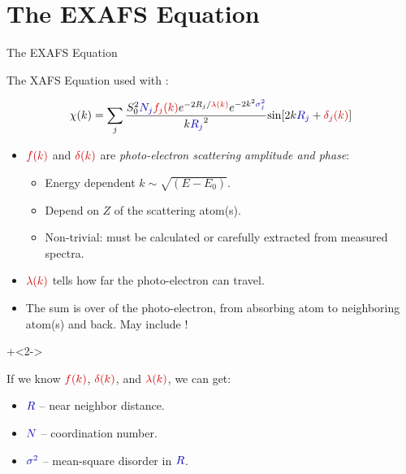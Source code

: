 \section{The EXAFS Equation}

\begin{slide}{The EXAFS Equation}  %

  \begin{cenpage}{135mm}

  The XAFS Equation used with {\feff}:

  \[
  \chi(k) = \sum_j {{ S_0^2 {\Blue{N_j}} {\Red{f_j(k)}}  e^{-2R_j/{\Red{\lambda(k)}}}
      e^{-2k^2{\Blue{\sigma_j^2}}}}\over{k{\Blue{R_j}}^2}}
  {\sin[{2k{\Blue{R_j}} + {\Red{\delta_j(k)}}} ]}
   \]

   \begin{itemize}
  \item $\Red{f(k)}$ and $\Red{\delta(k)}$ are  {\emph{photo-electron scattering
        amplitude and phase}}:
    \begin{itemize}
    \item Energy dependent    \hspace{3mm}  $k \sim \sqrt{(E-E_0)} $.
    \item Depend on $Z$ of the scattering atom(s).
    \item Non-trivial: must be calculated or carefully extracted from  measured spectra.
    \end{itemize}

\item $\Red{\lambda(k)}$ tells how far the photo-electron can travel.

\item The sum is over {} of the photo-electron,
  from absorbing atom to neighboring atom(s) and back.  May include
  {}!

\end{itemize}

   \onslide+<2->

   \begin{postitbox}{64mm}
     If we know $\Red{f(k)}$,  $\Red{\delta(k)}$, and $\Red{\lambda(k)}$, we can get:
     \begin{itemize}
     \item ${\Blue{R}}$ --  near neighbor distance.
     \item ${\Blue{N}}$ -- coordination number.
     \item ${\Blue{\sigma^2}}$ -- mean-square  disorder in ${\Blue{R}}$.
     \end{itemize}
   \end{postitbox}

\end{cenpage}  \end{slide}

